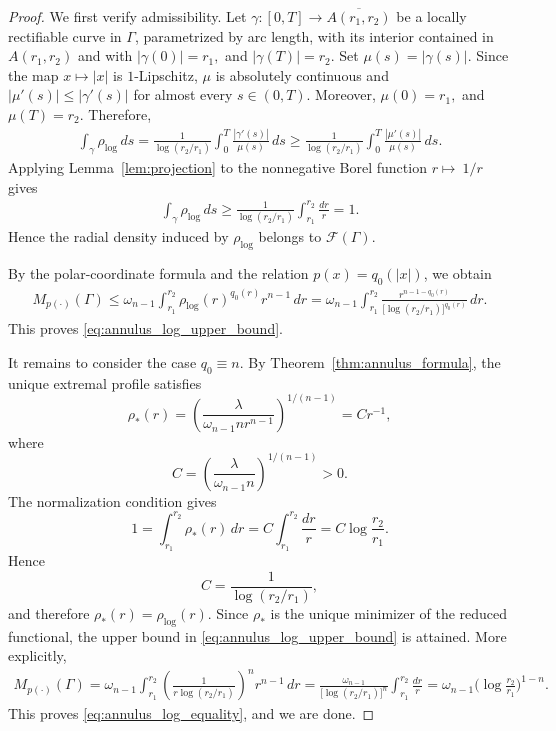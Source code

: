 \documentclass[12pt]{amsart}
\numberwithin{equation}{section}
\theoremstyle{plain}
\theoremstyle{definition}
\begin{document}
\begin{proof}
We first verify admissibility. Let
$\gamma:[0,T]\longrightarrow\overline{A(r_1,r_2)}$
be a locally rectifiable curve in $\Gamma$, parametrized by arc length,
with its interior contained in $A(r_1,r_2)$ and with $|\gamma(0)|=r_1,$ and $|\gamma(T)|=r_2.$
Set $\mu(s)=|\gamma(s)|.$
Since the map $x\mapsto |x|$ is $1$-Lipschitz,
$\mu$ is absolutely continuous and $|\mu'(s)|\le |\gamma'(s)|$ for almost every $s\in(0,T)$.
Moreover, $\mu(0)=r_1,$ and $\mu(T)=r_2.$
Therefore,
\begin{align}
\int_\gamma \rho_{\log}\,ds
=
\frac{1}{\log(r_2/r_1)}
\int_0^T
\frac{|\gamma'(s)|}{\mu(s)}\,ds
\ge
\frac{1}{\log(r_2/r_1)}
\int_0^T
\frac{|\mu'(s)|}{\mu(s)}\,ds.
\label{eq:log_density_projection}
\end{align}
Applying Lemma~\ref{lem:projection} to the nonnegative Borel function $r\longmapsto\ 1/r$
gives
\begin{align}
\int_\gamma \rho_{\log}\,ds
\ge
\frac{1}{\log(r_2/r_1)}
\int_{r_1}^{r_2}\frac{dr}{r}
=1.
\label{eq:log_density_admissible}
\end{align}
Hence the radial density induced by $\rho_{\log}$ belongs to
$\mathcal F(\Gamma)$.

By the polar-coordinate formula and the relation
$p(x)=q_0(|x|)$, we obtain
\begin{align}
M_{p(\cdot)}(\Gamma)
\le
\omega_{n-1}
\int_{r_1}^{r_2}
\rho_{\log}(r)^{q_0(r)}r^{n-1}\,dr
=
\omega_{n-1}
\int_{r_1}^{r_2}
\frac{r^{n-1-q_0(r)}}
{\bigl[\log(r_2/r_1)\bigr]^{q_0(r)}}
\,dr.
\end{align}
This proves \eqref{eq:annulus_log_upper_bound}.

It remains to consider the case $q_0\equiv n$. By
Theorem~\ref{thm:annulus_formula}, the unique extremal profile
satisfies
\begin{equation*}
\rho_*(r)
=
\left(
\frac{\lambda}
{\omega_{n-1}n r^{n-1}}
\right)^{1/(n-1)}
=
C r^{-1},
\end{equation*}
where
\begin{equation*}
C=
\left(
\frac{\lambda}{\omega_{n-1}n}
\right)^{1/(n-1)}
>0.
\end{equation*}
The normalization condition gives
\begin{equation*}
1
=
\int_{r_1}^{r_2}\rho_*(r)\,dr
=
C\int_{r_1}^{r_2}\frac{dr}{r}
=
C\log\frac{r_2}{r_1}.
\end{equation*}
Hence
\begin{equation*}
C=\frac{1}{\log(r_2/r_1)},
\end{equation*}
and therefore
$\rho_*(r)=\rho_{\log}(r)$.
Since $\rho_*$ is the unique minimizer of the reduced functional,
the upper bound in \eqref{eq:annulus_log_upper_bound} is attained.
More explicitly,
\begin{align}
M_{p(\cdot)}(\Gamma)
=
\omega_{n-1}
\int_{r_1}^{r_2}
\left(
\frac{1}{r\log(r_2/r_1)}
\right)^n
r^{n-1}\,dr
=
\frac{\omega_{n-1}}
{\bigl[\log(r_2/r_1)\bigr]^n}
\int_{r_1}^{r_2}\frac{dr}{r}
=
\omega_{n-1}
\biggl(\log\frac{r_2}{r_1}\biggr)^{1-n}.
\end{align}
This proves \eqref{eq:annulus_log_equality}, and we are done.
\end{proof}
\end{document}
